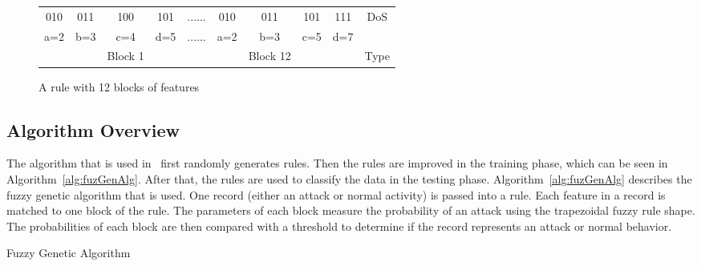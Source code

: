 \documentclass{sig-alternate}
\begin{document}
\begin{figure*}
\centering
\caption{A rule with 12 blocks of features}
\vspace{0.20cm}
\begin{tabular}{|cccc|c|cccc|c|} \hline
010 & 011 & 100 & 101   & ...... & 010 & 011 & 101 & 111   & DoS\\
a=2 & b=3 & c=4 & d=5   & ...... & a=2 & b=3 & c=5 & d=7   &\\ 
    &     & Block 1&    &        &     & Block 12& &       & Type\\
\hline\end{tabular}
\label{fig:rule}
\end{figure*}




\subsection{Algorithm Overview}
The algorithm that is used in~\cite{6496342, 6559603} first randomly generates rules. Then the rules are improved in the training phase, which can be seen in Algorithm~\ref{alg:fuzGenAlg}. After that, the rules are used to classify the data in the testing phase. Algorithm~\ref{alg:fuzGenAlg} describes the fuzzy genetic algorithm that is used. One record (either an attack or normal activity) is passed into a rule. Each feature in a record is matched to one block of the rule. The parameters of each block measure the probability of an attack using the trapezoidal fuzzy rule shape. The probabilities of each block are then compared with a threshold to determine if the record represents an attack or normal behavior.

\begin{algorithm}
\caption{Fuzzy Genetic Algorithm}
\label{alg:fuzGenAlg}
\begin{algorithmic}

    \ENDFOR
    
      \ELSE {}
    \ENDIF
  \ENDFOR
  
\ENDFOR
{}
\end{algorithmic}
\end{algorithm}
\end{document}
